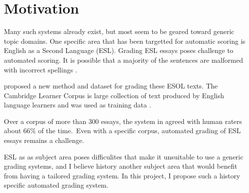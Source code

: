 \section{Motivation}
\label{section:motivation}
Many such systems already exist, but most seem to be geared toward generic topic domains. One specific area that has been targetted for automatic scoring is English as a Second Language (ESL). Grading ESL essays poses challenge to automated scoring. It is possible that a majority of the sentences are malformed with incorrect spellings \cite{ESOL2}.

\cite{ESOL} proposed a new method and dataset for grading these ESOL texts. The Cambridge Learner Corpus is large collection of text produced by English language learners and was used as training data \cite{ESOL}. 

Over a corpus of more than 300 essays, the system in \cite{ESOL2} agreed with human raters about 66\% of the time.\ Even with a specific corpus, automated grading of ESL essays remains a challenge. 

ESL as as subject area poses difficulites that make it unsuitable to use a generic grading systems, and I believe history another subject area that would benefit from having a tailored grading system. In this project, I propose such a history specific automated grading system.
